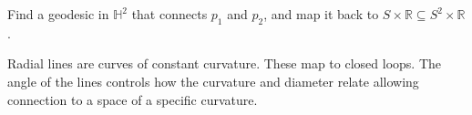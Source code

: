 \begin{figure}[h]
\end{figure}

Find a geodesic in $\mathbb{H}^2$ that connects $p_1$ and $p_2$, and map it back to $S \times \mathbb{R} \subseteq S^2 \times \mathbb{R}$.

Radial lines are curves of constant curvature. These map to closed loops. The angle of the lines controls how the curvature and diameter relate allowing connection to a space of a specific curvature.
